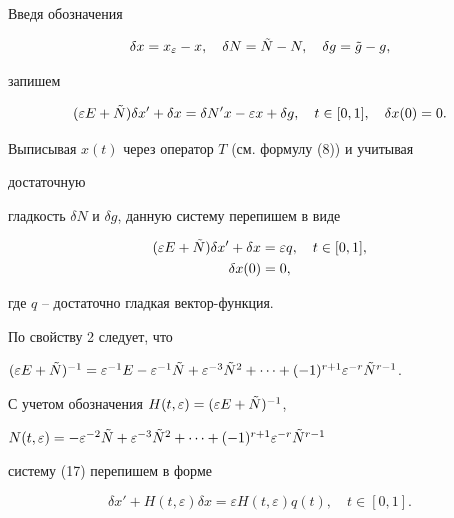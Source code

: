\begin{pf} Введя обозначения


$$


\delta x=x_\varepsilon-x,\quad \delta N=\Tilde N-N,\quad


\delta g=\Tilde g-g,


$$


запишем


$$


(\varepsilon E+\Tilde N)\delta x'+\delta x=\delta N'x-\varepsilon x+


\delta g,\quad t\in[0,1],\quad \delta x(0)=0.


$$





Выписывая $x(t)$ через оператор $T$ (см. формулу (8)) и учитывая


достаточную


гладкость $\delta N$ и $\delta g$, данную систему перепишем в виде


\begin{gather}


(\varepsilon E+\Tilde N)\delta x'+\delta x=\varepsilon q,\quad


t\in[0,1],\\


\delta x(0)=0,


\end{gather}


где $q$ -- достаточно гладкая вектор-функция.


По свойству 2 следует, что


$(\varepsilon E+\Tilde N)^{-1}=\varepsilon^{-1}E-


\varepsilon^{-1}\Tilde N+\varepsilon^{-3}\Tilde N^2+\dotsb+


(-1)^{r+1}\varepsilon^{-r}\Tilde N^{r-1}$.


С учетом обозначения $H(t,\varepsilon)=(\varepsilon E+\Tilde N)^{-1}$,


$N(t,\varepsilon)=-\varepsilon^{-2}\Tilde N+\varepsilon^{-3}


\Tilde N^2+\dotsb+(-1)^{r+1}\varepsilon^{-r}\Tilde N^{r-1}$


систему (17) перепишем в форме


\begin{equation}


\delta x'+H(t,\varepsilon)\delta x=\varepsilon H(t,\varepsilon)q(t),


\quad t\in[0,1].



\end{equation}
\end{pf}
